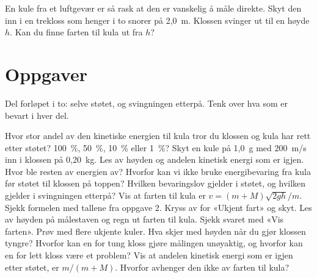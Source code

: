 \documentclass[11pt]{article}
\begin{document}

En kule fra et luftgevær er så rask at den er vanskelig å måle direkte. Skyt den inn i en trekloss som henger i to snorer på 2,0~m. Klossen svinger ut til en høyde $h$. Kan du finne farten til kula ut fra $h$?

\section*{Oppgaver}

Del forløpet i to: selve støtet, og svingningen etterpå. Tenk over hva som er bevart i hver del.

\begin{oppgaveliste}
\oppgave {}Hvor stor andel av den kinetiske energien til kula tror du klossen og kula har rett etter støtet? 100~\%, 50~\%, 10~\% eller 1~\%?
\svar
\oppgave {}Skyt en kule på 1,0~g med 200~m/s inn i klossen på 0,20~kg. Les av høyden og andelen kinetisk energi som er igjen. Hvor ble resten av energien av?
\svar
\oppgave {}Hvorfor kan vi ikke bruke energibevaring fra kula før støtet til klossen på toppen? Hvilken bevaringslov gjelder i støtet, og hvilken gjelder i svingningen etterpå?
\svar
\oppgave {}Vis at farten til kula er $v = (m + M)\sqrt{2gh} / m$. Sjekk formelen med tallene fra oppgave 2.
\svar
\oppgave {}Kryss av for «Ukjent fart» og skyt. Les av høyden på målestaven og regn ut farten til kula. Sjekk svaret med «Vis farten». Prøv med flere ukjente kuler.
\svar
\oppgave {}Hva skjer med høyden når du gjør klossen tyngre? Hvorfor kan en for tung kloss gjøre målingen unøyaktig, og hvorfor kan en for lett kloss være et problem?
\svar
\oppgave {}Vis at andelen kinetisk energi som er igjen etter støtet, er $m / (m + M)$. Hvorfor avhenger den ikke av farten til kula?
\svar
\end{oppgaveliste}
\end{document}
